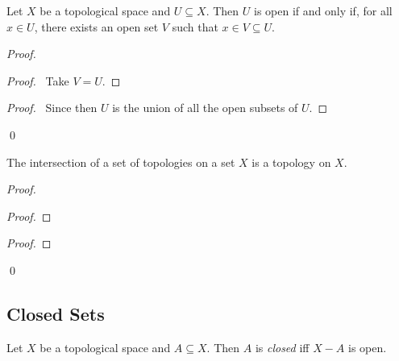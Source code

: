 \begin{prop}
\label{prop:open}
Let $X$ be a topological space and $U \subseteq X$. Then $U$ is open if and only if, for all $x \in U$, there exists an open set $V$ such that $x \in V \subseteq U$.
\end{prop}

\begin{proof}
\pf
{}
\begin{proof}
	\pf\ Take $V = U$.
\end{proof}
\begin{proof}
	\pf\ Since then $U$ is the union of all the open subsets of $U$.
\end{proof}
\qed
\end{proof}

\begin{prop}
The intersection of a set of topologies on a set $X$ is a topology on $X$.
\end{prop}

\begin{proof}
\pf
{}
\begin{proof}
\end{proof}
\begin{proof}
\end{proof}
\qed
\end{proof}

\subsection{Closed Sets}

\begin{df}
Let $X$ be a topological space and $A \subseteq X$. Then $A$ is \emph{closed} iff $X - A$ is open.
\end{df}


